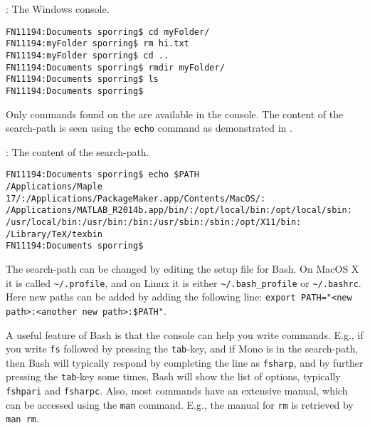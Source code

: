 \begin{codeNOutput}[label=LinuxRm]{: The Windows console.}
  \begin{lstlisting}[language=console,escapechar=§]
FN11194:Documents sporring$ cd myFolder/
FN11194:myFolder sporring$ rm hi.txt 
FN11194:myFolder sporring$ cd ..
FN11194:Documents sporring$ rmdir myFolder/
FN11194:Documents sporring$ ls
FN11194:Documents sporring$ 
\end{lstlisting}
\end{codeNOutput}
Only commands found on the  are available in the console. The content of the search-path is seen using the \lstinline[language=console]{echo} command as demonstrated in .
\begin{codeNOutput}[label=LinuxSearchPath]{: The content of the search-path.}
  \begin{lstlisting}[language=console,escapechar=§]
FN11194:Documents sporring$ echo $PATH
/Applications/Maple 17/:/Applications/PackageMaker.app/Contents/MacOS/: /Applications/MATLAB_R2014b.app/bin/:/opt/local/bin:/opt/local/sbin: /usr/local/bin:/usr/bin:/bin:/usr/sbin:/sbin:/opt/X11/bin: /Library/TeX/texbin
FN11194:Documents sporring$ 
\end{lstlisting}%
\end{codeNOutput}
The search-path can be changed by editing the setup file for Bash. On MacOS X it is called \lstinline[language=console]{~/.profile}, and on Linux it is either \lstinline[language=console]{~/.bash_profile} or \lstinline[language=console]{~/.bashrc}. Here new paths can be added by adding the following line: \lstinline[language=console]{export PATH="<new path>:<another new path>:$PATH"}. %

A useful feature of Bash is that the console can help you write commands. E.g., if you write \lstinline[language=console]{fs} followed by pressing the \lstinline[language=console]{tab}-key, and if Mono is in the search-path, then Bash will typically respond by completing the line as \lstinline[language=console]{fsharp}, and by further pressing the \lstinline[language=console]{tab}-key some times, Bash will show the list of options, typically \lstinline[language=console]{fshpari} and \lstinline[language=console]{fsharpc}. Also, most commands have an extensive manual, which can be accessed using the \lstinline[language=console]{man} command. E.g., the manual for \lstinline[language=console]{rm} is retrieved by \lstinline[language=console]{man rm}.

